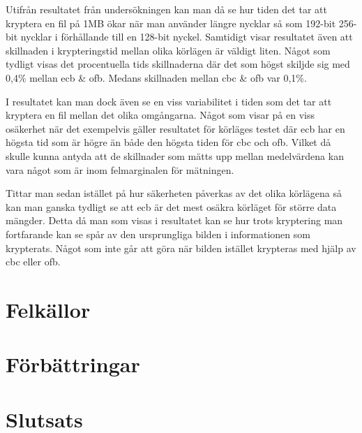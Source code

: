 \label{chap:discussion}

Utifrån resultatet från undersökningen kan man då se hur tiden det tar att kryptera en fil på 1MB ökar när man använder längre nycklar så som 192-\gls{bit} 256-\gls{bit} nycklar
i förhållande till en 128-\gls{bit} nyckel. Samtidigt visar resultatet även att skillnaden i krypteringstid mellan olika körlägen är väldigt liten.
Något som tydligt visas det procentuella tids skillnaderna där det som högst skiljde sig med 0,4\% mellan \acrshort{ecb} \& \acrshort{ofb}.
Medans skillnaden mellan \acrshort{cbc} \& \acrshort{ofb} var 0,1\%.

I resultatet kan man dock även se en viss variabilitet i tiden som det tar att kryptera en fil mellan det olika omgångarna. Något som visar på en viss osäkerhet när det exempelvis gäller
resultatet för körläges testet där \acrshort{ecb} har en högsta tid som är högre än både den högsta tiden för \acrshort{cbc} och \acrshort{ofb}. Vilket då skulle kunna antyda
att de skillnader som mätts upp mellan medelvärdena kan vara något som är inom felmarginalen för mätningen.

Tittar man sedan istället på hur säkerheten påverkas av det olika körlägena så kan man ganska tydligt se att \acrshort{ecb} är det mest osäkra körläget för större data mängder.
Detta då man som visas i resultatet kan se hur trots kryptering man fortfarande kan se spår av den ursprungliga bilden i informationen som krypterats. Något som inte
går att göra när bilden istället krypteras med hjälp av \acrshort{cbc} eller \acrshort{ofb}.



\section{Felkällor} %


\section{Förbättringar} %


\section{Slutsats}

